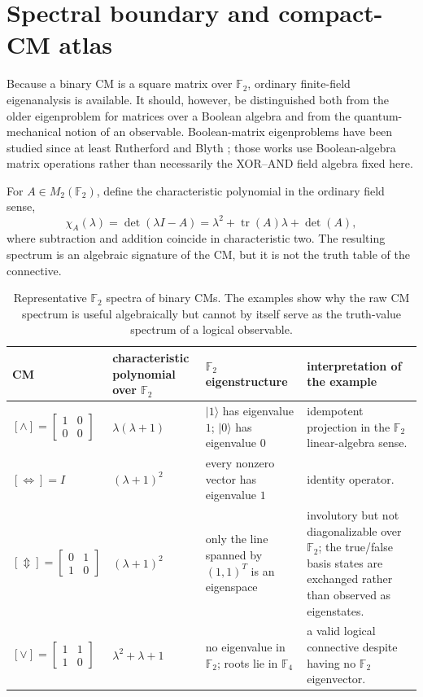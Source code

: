 \documentclass[11pt]{article}
\theoremstyle{definition}
\theoremstyle{remark}
\newcommand{\F}{\mathbb F}
\begin{document}
\appendix

\section{Spectral boundary and compact-CM atlas}
\label{sec:spectrum}

Because a binary CM is a square matrix over $\F_2$, ordinary finite-field eigenanalysis is available.  It should, however, be distinguished both from the older eigenproblem for matrices over a Boolean algebra and from the quantum-mechanical notion of an observable.  Boolean-matrix eigenproblems have been studied since at least Rutherford and Blyth \cite{Rutherford1965,Blyth1967}; those works use Boolean-algebra matrix operations rather than necessarily the XOR--AND field algebra fixed here.

For $A\in M_2(\F_2)$, define the characteristic polynomial in the ordinary field sense,
\[
 \chi_A(\lambda)=\det(\lambda I-A)
 =\lambda^2+\operatorname{tr}(A)\lambda+\det(A),
\]
where subtraction and addition coincide in characteristic two.  The resulting spectrum is an algebraic signature of the CM, but it is not the truth table of the connective.

\begin{table}[ht]
\centering
\small
\begin{tabular}{L{0.14\textwidth}L{0.18\textwidth}L{0.22\textwidth}L{0.34\textwidth}}
\toprule
CM & characteristic polynomial over $\F_2$ & $\F_2$ eigenstructure & interpretation of the example \\
\midrule
$[\land]=\left[\begin{smallmatrix}1&0\\0&0\end{smallmatrix}\right]$
& $\lambda(\lambda+1)$
& $|1\rangle$ has eigenvalue $1$; $|0\rangle$ has eigenvalue $0$
& idempotent projection in the $\F_2$ linear-algebra sense.\\
$[\Leftrightarrow]=I$
& $(\lambda+1)^2$
& every nonzero vector has eigenvalue $1$
& identity operator.\\
$[\Updownarrow]=\left[\begin{smallmatrix}0&1\\1&0\end{smallmatrix}\right]$
& $(\lambda+1)^2$
& only the line spanned by $(1,1)^T$ is an eigenspace
& involutory but not diagonalizable over $\F_2$; the true/false basis states are exchanged rather than observed as eigenstates.\\
$[\lor]=\left[\begin{smallmatrix}1&1\\1&0\end{smallmatrix}\right]$
& $\lambda^2+\lambda+1$
& no eigenvalue in $\F_2$; roots lie in $\F_4$
& a valid logical connective despite having no $\F_2$ eigenvector.\\
\bottomrule
\end{tabular}
\caption{Representative $\F_2$ spectra of binary CMs.  The examples show why the raw CM spectrum is useful algebraically but cannot by itself serve as the truth-value spectrum of a logical observable.}
\label{tab:cmspectrum}
\end{table}
\end{document}
